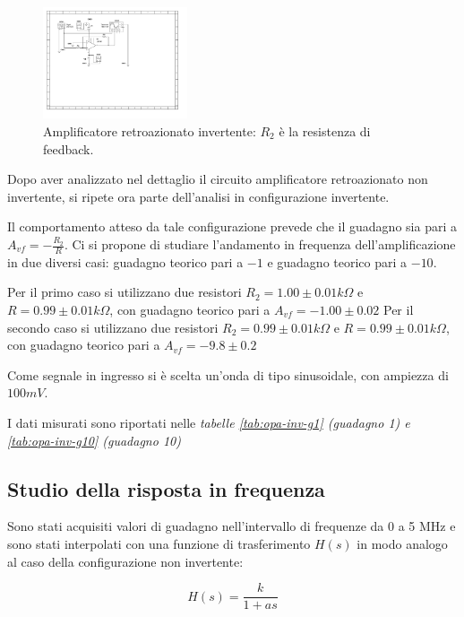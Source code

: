 \documentclass[journal]{IEEEtran}
\begin{document}
\begin{figure}[H]%
\begin {center}
\includegraphics[width=0.38\textwidth]{sch-simulations/output/OPA-closed-loop-inverting.pdf}
\caption{Amplificatore retroazionato invertente: $R_2$ è la resistenza di feedback.}
\label{fig:circ_closed_loop_inv}
\end {center}
\end{figure}

Dopo aver analizzato nel dettaglio il circuito amplificatore retroazionato non invertente, si ripete ora parte dell'analisi in configurazione invertente.

Il comportamento atteso da tale configurazione prevede che il guadagno sia pari a $A_{vf} = -\frac{R_2}{R}$. 
Ci si propone di studiare l'andamento in frequenza dell'amplificazione in due diversi casi: guadagno teorico pari a $-1$ e guadagno teorico pari a $-10$.

Per il primo caso si utilizzano due resistori $R_2 = 1.00 \pm 0.01 k\Omega $ e $R = 0.99 \pm 0.01 k\Omega$, con guadagno teorico pari a $A_{vf} = -1.00 \pm 0.02 $ Per il secondo caso si utilizzano due resistori $R_2 = 0.99 \pm 0.01 k\Omega $ e $R = 0.99 \pm 0.01 k\Omega$, con guadagno teorico pari a $A_{vf} = -9.8 \pm 0.2$

Come segnale in ingresso si è scelta un'onda di tipo sinusoidale, con ampiezza di $100 mV$.

I dati misurati sono riportati nelle \textit{tabelle \ref{tab:opa-inv-g1} (guadagno 1) e \ref{tab:opa-inv-g10} (guadagno 10)}

\subsection{\textbf{Studio della risposta in frequenza}}

Sono stati acquisiti valori di guadagno nell'intervallo di frequenze da 0 a 5 MHz e sono stati interpolati con una funzione di trasferimento $H(s)$ in modo analogo al caso della configurazione non invertente: 

\begin{equation}
    H(s) = \frac{k}{1+as}
\end{equation}
\end{document}
